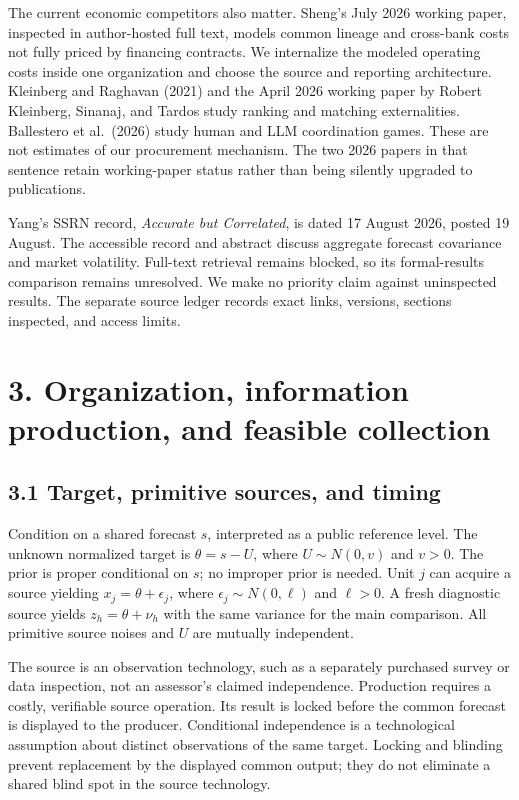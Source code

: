\documentclass[
  11pt,
]{article}
\begin{document}
The current economic competitors also matter. Sheng's July 2026 working
paper, inspected in author-hosted full text, models common lineage and
cross-bank costs not fully priced by financing contracts. We internalize
the modeled operating costs inside one organization and choose the
source and reporting architecture. Kleinberg and Raghavan (2021) and the
April 2026 working paper by Robert Kleinberg, Sinanaj, and Tardos study
ranking and matching externalities. Ballestero et al.~(2026) study human
and LLM coordination games. These are not estimates of our procurement
mechanism. The two 2026 papers in that sentence retain working-paper
status rather than being silently upgraded to publications.

Yang's SSRN record, \emph{Accurate but Correlated}, is dated 17 August
2026, posted 19 August. The accessible record and abstract discuss
aggregate forecast covariance and market volatility. Full-text retrieval
remains blocked, so its formal-results comparison remains unresolved. We
make no priority claim against uninspected results. The separate source
ledger records exact links, versions, sections inspected, and access
limits.

\section{3. Organization, information production, and feasible
collection}\label{organization-information-production-and-feasible-collection}

\subsection{3.1 Target, primitive sources, and
timing}\label{target-primitive-sources-and-timing}

Condition on a shared forecast \(s\), interpreted as a public reference
level. The unknown normalized target is \(\theta=s-U\), where
\(U\sim N(0,v)\) and \(v>0\). The prior is proper conditional on \(s\);
no improper prior is needed. Unit \(j\) can acquire a source yielding
\(x_j=\theta+\epsilon_j\), where \(\epsilon_j\sim N(0,\ell)\) and
\(\ell>0\). A fresh diagnostic source yields \(z_h=\theta+\nu_h\) with
the same variance for the main comparison. All primitive source noises
and \(U\) are mutually independent.

The source is an observation technology, such as a separately purchased
survey or data inspection, not an assessor's claimed independence.
Production requires a costly, verifiable source operation. Its result is
locked before the common forecast is displayed to the producer.
Conditional independence is a technological assumption about distinct
observations of the same target. Locking and blinding prevent
replacement by the displayed common output; they do not eliminate a
shared blind spot in the source technology.
\end{document}
